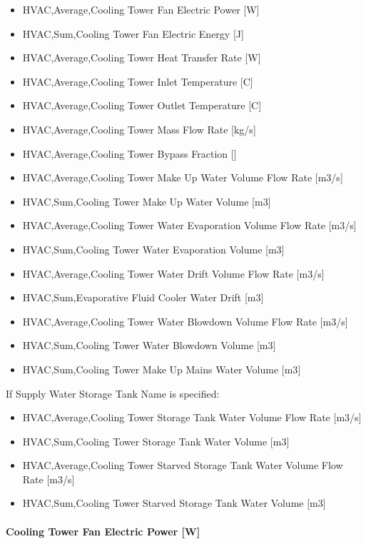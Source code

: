 \begin{itemize}
\item
  HVAC,Average,Cooling Tower Fan Electric Power {[}W{]}
\item
  HVAC,Sum,Cooling Tower Fan Electric Energy {[}J{]}
\item
  HVAC,Average,Cooling Tower Heat Transfer Rate {[}W{]}
\item
  HVAC,Average,Cooling Tower Inlet Temperature {[}C{]}
\item
  HVAC,Average,Cooling Tower Outlet Temperature {[}C{]}
\item
  HVAC,Average,Cooling Tower Mass Flow Rate {[}kg/s{]}
\item
  HVAC,Average,Cooling Tower Bypass Fraction {[]}
\item
  HVAC,Average,Cooling Tower Make Up Water Volume Flow Rate {[}m3/s{]}
\item
  HVAC,Sum,Cooling Tower Make Up Water Volume {[}m3{]}
\item
  HVAC,Average,Cooling Tower Water Evaporation Volume Flow Rate {[}m3/s{]}
\item
  HVAC,Sum,Cooling Tower Water Evaporation Volume {[}m3{]}
\item
  HVAC,Average,Cooling Tower Water Drift Volume Flow Rate {[}m3/s{]}
\item
  HVAC,Sum,Evaporative Fluid Cooler Water Drift {[}m3{]}
\item
  HVAC,Average,Cooling Tower Water Blowdown Volume Flow Rate {[}m3/s{]}
\item
  HVAC,Sum,Cooling Tower Water Blowdown Volume {[}m3{]}
\item
  HVAC,Sum,Cooling Tower Make Up Mains Water Volume {[}m3{]}
\end{itemize}

If Supply Water Storage Tank Name is specified:

\begin{itemize}
\item
  HVAC,Average,Cooling Tower Storage Tank Water Volume Flow Rate {[}m3/s{]}
\item
  HVAC,Sum,Cooling Tower Storage Tank Water Volume {[}m3{]}
\item
  HVAC,Average,Cooling Tower Starved Storage Tank Water Volume Flow Rate {[}m3/s{]}
\item
  HVAC,Sum,Cooling Tower Starved Storage Tank Water Volume {[}m3{]}
\end{itemize}

\paragraph{Cooling Tower Fan Electric Power {[}W{]}}\label{cooling-tower-fan-electric-power-w-4}

